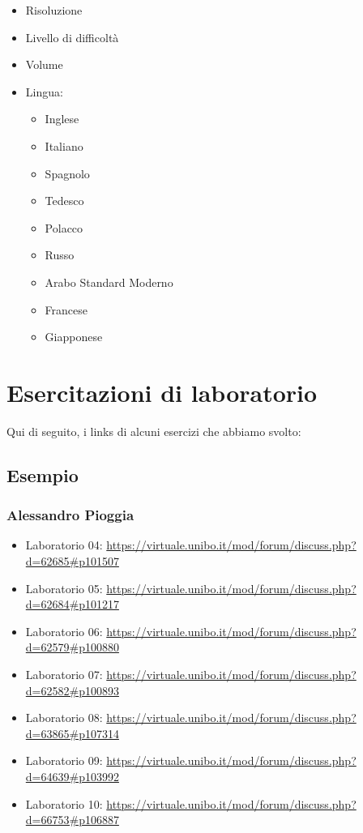 \begin{itemize}
	\item \textsf{\small Risoluzione}
	\item \textsf{\small Livello di difficoltà}
	\item \textsf{\small Volume}
	\item \textsf{\small Lingua:}
	\begin{itemize}
		\item \textsf{\small Inglese}
		\item \textsf{\small Italiano}
		\item \textsf{\small Spagnolo}
		\item \textsf{\small Tedesco}
		\item \textsf{\small Polacco}
		\item \textsf{\small Russo}
		\item \textsf{\small Arabo Standard Moderno}
		\item \textsf{\small Francese}
		\item \textsf{\small Giapponese}
	\end{itemize}
\end{itemize}

\chapter{Esercitazioni di laboratorio}

\textsf{\small Qui di seguito, i links di alcuni esercizi che abbiamo svolto:} \\

\section*{Esempio}

\subsection{Alessandro Pioggia}

\begin{itemize}
	\item Laboratorio 04: \url{https://virtuale.unibo.it/mod/forum/discuss.php?d=62685#p101507}
	\item Laboratorio 05: \url{https://virtuale.unibo.it/mod/forum/discuss.php?d=62684#p101217}
	\item Laboratorio 06: \url{https://virtuale.unibo.it/mod/forum/discuss.php?d=62579#p100880}
	\item Laboratorio 07: \url{https://virtuale.unibo.it/mod/forum/discuss.php?d=62582#p100893}
	\item Laboratorio 08: \url{https://virtuale.unibo.it/mod/forum/discuss.php?d=63865#p107314}
	\item Laboratorio 09: \url{https://virtuale.unibo.it/mod/forum/discuss.php?d=64639#p103992}
	\item Laboratorio 10: \url{https://virtuale.unibo.it/mod/forum/discuss.php?d=66753#p106887}
\end{itemize}

